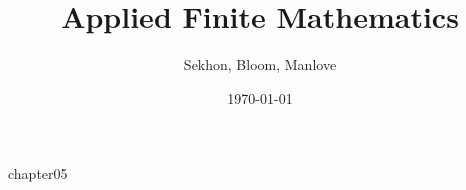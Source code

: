 \documentclass[12pt]{book}
\begin{document}

\frontmatter
\title{Applied Finite Mathematics}
\author{Sekhon, Bloom, Manlove}
\date{\today}
\maketitle
\tableofcontents

\mainmatter
{chapter05}



\backmatter
\end{document}
